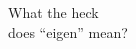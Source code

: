 \documentclass[preview]{standalone}
\begin{document}
\centering
What the heck \\ does ``eigen'' mean?
\end{document}
